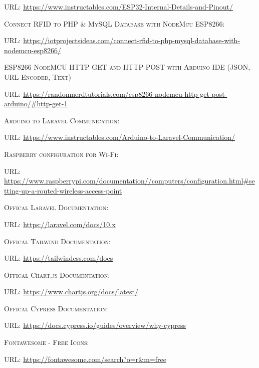 \documentclass[
]{thesis-ekf}
\theoremstyle{definition}
\theoremstyle{remark}
\begin{document}
\begin{thebibliography}{20}
		\textsc{URL:} \url{https://www.instructables.com/ESP32-Internal-Details-and-Pinout/}
		
		\textsc{Connect RFID to PHP \& MySQL Database with NodeMcu ESP8266}:
		
		\textsc{URL:} \url{https://iotprojectsideas.com/connect-rfid-to-php-mysql-database-with-nodemcu-esp8266/}
		
		\textsc{ESP8266 NodeMCU HTTP GET and HTTP POST with Arduino IDE (JSON, URL Encoded, Text)}
		
		\textsc{URL:} \url{https://randomnerdtutorials.com/esp8266-nodemcu-http-get-post-arduino/#http-get-1}
		
		\textsc{Arduino to Laravel Communication}:
		
		\textsc{URL:} \url{https://www.instructables.com/Arduino-to-Laravel-Communication/}
		
		\textsc{Raspberry configuration for Wi-Fi}:
		
		\textsc{URL:} \url{https://www.raspberrypi.com/documentation//computers/configuration.html#setting-up-a-routed-wireless-access-point}
		
		\textsc{Offical Laravel Documentation}:
		
		\textsc{URL:} \url{https://laravel.com/docs/10.x}
		
		\textsc{Offical Tailwind Documentation}:
		
		\textsc{URL:} \url{https://tailwindcss.com/docs}
		
		\textsc{Offical Chart.js Documentation}:
		
		\textsc{URL:} \url{https://www.chartjs.org/docs/latest/}
			
		\textsc{Offical Cypress Documentation}:
		
		\textsc{URL:} \url{https://docs.cypress.io/guides/overview/why-cypress}
		
		\textsc{Fontawesome - Free Icons}:
		
		\textsc{URL:} \url{https://fontawesome.com/search?o=r&m=free}
				
	\end{thebibliography}
	
	
\end{document}

